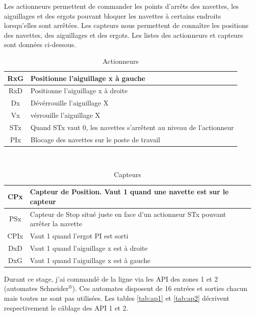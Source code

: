 \documentclass[a4paper,french, titlepage]{book}
\begin{document}
Les actionneurs permettent de commander les points d'arrêts des navettes, les aiguillages et des ergots pouvant bloquer les navettes à certains endroits lorsqu'elles sont arrêtées. Les capteurs nous permettent de connaître les positions des navettes, des aiguillages et des ergots. Les listes des actionneurs et capteurs sont données ci-dessous.

\begin{table}[H]

 
\begin{center}
\begin{tabular}{|c||l|}
	\hline RxG   & Positionne l'aiguillage x à gauche  \\
	\hline RxD   & Positionne l'aiguillage x à droite  \\
	\hline Dx    & Dévérrouille l'aiguillage X          \\
	\hline Vx    & vérrouille l'aiguillage X            \\
	\hline STx   & Quand STx vaut 0, les navettes s'arrêtent au niveau de l'actionneur \\
	\hline PIx    & Blocage des navettes sur le poste de travail \\
	\hline
\end{tabular}     
\end{center}
\caption{\label{tab:actionneurs}Actionneurs}
\end{table}
\

\begin{table}[H]

 	  
\begin{center}
	\begin{tabular}{|c||l|}
	\hline CPx   & Capteur de Position. Vaut 1 quand une navette est sur le capteur \\
	\hline PSx   & Capteur de Stop situé juste en face d'un actionneur STx pouvant arrêter la navette \\
	\hline CPIx  & Vaut 1 quand l'ergot PI est sorti      \\
	\hline DxD   & Vaut 1 quand l'aiguillage x est à droite         \\
	\hline DxG   & Vaut 1 quand l'aiguillage x est à gauche \\
	\hline
	\end{tabular}        
\end{center}
\caption{\label{tab:capteurs}Capteurs}
\end{table}

Durant ce stage, j'ai commandé de la ligne via les API des zones 1 et 2 (automates Schneider$^{\circledR}$). Ces automates disposent de 16 entrées et sorties chacun mais toutes ne sont pas utilisées. Les tables \ref{tab:ap1} et \ref{tab:ap2} décrivent respectivement le câblage des API 1 et 2. \\
\end{document}
